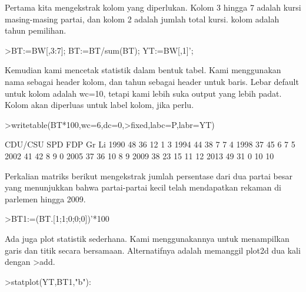 \documentclass[a4paper,10pt]{article}
\begin{document}
\begin{eulernotebook}
\begin{eulercomment}
Pertama kita mengekstrak kolom yang diperlukan. Kolom 3 hingga 7
adalah kursi masing-masing partai, dan kolom 2 adalah jumlah total
kursi. kolom adalah tahun pemilihan.
\end{eulercomment}
\begin{eulerprompt}
>BT:=BW[,3:7]; BT:=BT/sum(BT); YT:=BW[,1]';
\end{eulerprompt}
\begin{eulercomment}
Kemudian kami mencetak statistik dalam bentuk tabel. Kami menggunakan
nama sebagai header kolom, dan tahun sebagai header untuk baris. Lebar
default untuk kolom adalah wc=10, tetapi kami lebih suka output yang
lebih padat. Kolom akan diperluas untuk label kolom, jika perlu.
\end{eulercomment}
\begin{eulerprompt}
>writetable(BT*100,wc=6,dc=0,>fixed,labc=P,labr=YT)
\end{eulerprompt}
\begin{euleroutput}
         CDU/CSU   SPD   FDP    Gr    Li
    1990      48    36    12     1     3
    1994      44    38     7     7     4
    1998      37    45     6     7     5
    2002      41    42     8     9     0
    2005      37    36    10     8     9
    2009      38    23    15    11    12
    2013      49    31     0    10    10
\end{euleroutput}
\begin{eulercomment}
Perkalian matriks berikut mengekstrak jumlah persentase dari dua
partai besar yang menunjukkan bahwa partai-partai kecil telah
mendapatkan rekaman di parlemen hingga 2009.
\end{eulercomment}
\begin{eulerprompt}
>BT1:=(BT.[1;1;0;0;0])'*100
\end{eulerprompt}
\begin{euleroutput}
  [84.29,  81.25,  81.1659,  82.7529,  72.9642,  61.8971,  79.8732]
\end{euleroutput}
\begin{eulercomment}
Ada juga plot statistik sederhana. Kami menggunakannya untuk
menampilkan garis dan titik secara bersamaan. Alternatifnya adalah
memanggil plot2d dua kali dengan \textgreater{}add.
\end{eulercomment}
\begin{eulerprompt}
>statplot(YT,BT1,"b"):
\end{eulerprompt}
\begin{eulercomment}

\end{eulercomment}
\end{eulernotebook}
\end{document}
